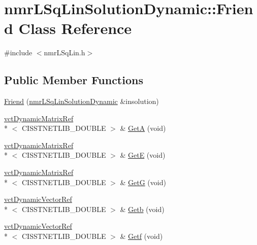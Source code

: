 \hypertarget{classnmr_l_sq_lin_solution_dynamic_1_1_friend}{\section{nmr\-L\-Sq\-Lin\-Solution\-Dynamic\-:\-:Friend Class Reference}
\label{classnmr_l_sq_lin_solution_dynamic_1_1_friend}
}


{\ttfamily \#include $<$nmr\-L\-Sq\-Lin.\-h$>$}

\subsection*{Public Member Functions}
\begin{DoxyCompactItemize}
\item 
\hyperlink{classnmr_l_sq_lin_solution_dynamic_1_1_friend_abf75c7fb3d89303f167226e90de9724a}{Friend} (\hyperlink{classnmr_l_sq_lin_solution_dynamic}{nmr\-L\-Sq\-Lin\-Solution\-Dynamic} \&insolution)
\item 
\hyperlink{classvct_dynamic_matrix_ref}{vct\-Dynamic\-Matrix\-Ref}\\*
$<$ C\-I\-S\-S\-T\-N\-E\-T\-L\-I\-B\-\_\-\-D\-O\-U\-B\-L\-E $>$ \& \hyperlink{classnmr_l_sq_lin_solution_dynamic_1_1_friend_a133ba2330bd2db5fa3cd3dab3e7e41f5}{Get\-A} (void)
\item 
\hyperlink{classvct_dynamic_matrix_ref}{vct\-Dynamic\-Matrix\-Ref}\\*
$<$ C\-I\-S\-S\-T\-N\-E\-T\-L\-I\-B\-\_\-\-D\-O\-U\-B\-L\-E $>$ \& \hyperlink{classnmr_l_sq_lin_solution_dynamic_1_1_friend_ab78018b4416251b404af53dd49ccf1da}{Get\-E} (void)
\item 
\hyperlink{classvct_dynamic_matrix_ref}{vct\-Dynamic\-Matrix\-Ref}\\*
$<$ C\-I\-S\-S\-T\-N\-E\-T\-L\-I\-B\-\_\-\-D\-O\-U\-B\-L\-E $>$ \& \hyperlink{classnmr_l_sq_lin_solution_dynamic_1_1_friend_af0b6de5f797353422a5a0a64a5fc889b}{Get\-G} (void)
\item 
\hyperlink{classvct_dynamic_vector_ref}{vct\-Dynamic\-Vector\-Ref}\\*
$<$ C\-I\-S\-S\-T\-N\-E\-T\-L\-I\-B\-\_\-\-D\-O\-U\-B\-L\-E $>$ \& \hyperlink{classnmr_l_sq_lin_solution_dynamic_1_1_friend_a91038670070e0134c2cd0892edfe0166}{Getb} (void)
\item 
\hyperlink{classvct_dynamic_vector_ref}{vct\-Dynamic\-Vector\-Ref}\\*
$<$ C\-I\-S\-S\-T\-N\-E\-T\-L\-I\-B\-\_\-\-D\-O\-U\-B\-L\-E $>$ \& \hyperlink{classnmr_l_sq_lin_solution_dynamic_1_1_friend_a0f0235acd7c3fb49a43a03f60b741cb6}{Getf} (void)

\end{DoxyCompactItemize}
